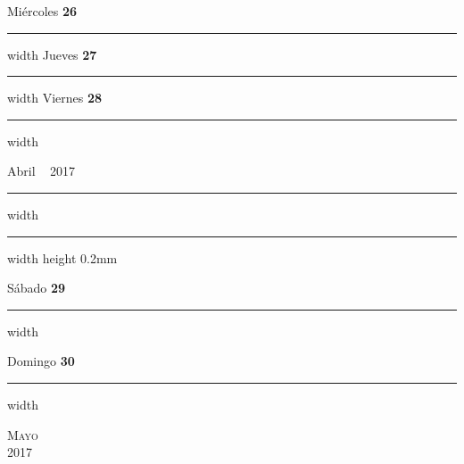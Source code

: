 \documentclass[portrait]{article}
\newcommand\blankpage{%
\null 
\thispagestyle{empty}%
\addtocounter{page}{-1}%
\newpage}
\begin{document}
\hfill \break \hfill \break 
{\Large Mi\'ercoles} {\LARGE\color{Dandelion} \textbf{26}}  \hfill \break\hrule width \hsize \kern 2pt\hfill \break \hfill \break \hfill \break \hfill \break \hfill \break \break 
\hfill \break \hfill \break 
{\Large Jueves} {\LARGE\color{Dandelion} \textbf{27}}  \hfill \break\hrule width \hsize \kern 2pt\hfill \break \hfill \break \hfill \break \hfill \break \hfill \break \break 
\hfill \break \hfill \break 
{\Large Viernes} {\LARGE\color{Dandelion} \textbf{28}}  \hfill \break\hrule width \hsize \kern 2pt\hfill \break \hfill \break \hfill \break \hfill \break \hfill \break \break 
\newpage {} \begin{flushright}{\Huge Abril} ~ {\color{Dandelion} \large 2017} \end{flushright} 
\hrule depth 0.3mm width \hsize \kern 1pt \hrule width \hsize height 0.2mm 
\hfill \break 
 \begin{flushright}{\Large S\'abado} {\LARGE\color{Dandelion} \textbf{29}}\end{flushright}\hrule width \hsize \kern 2pt\hfill \break \hfill \break \hfill \break \hfill \break \hfill \break \break
\hfill \break 
 \begin{flushright}{\Large Domingo} {\LARGE\color{Dandelion} \textbf{30}}\end{flushright}\hrule width \hsize \kern 2pt\hfill \break \hfill \break \hfill \break \hfill \break \hfill \break \break
\afterpage{\blankpage}\newpage {}\pagestyle{empty} %
\noindent 
{} %
\begin{center} 
\textsc{\Huge \color{Dandelion}Mayo}\\ %
\textsc{\large 2017} %
\end{center} 
\end{document}
